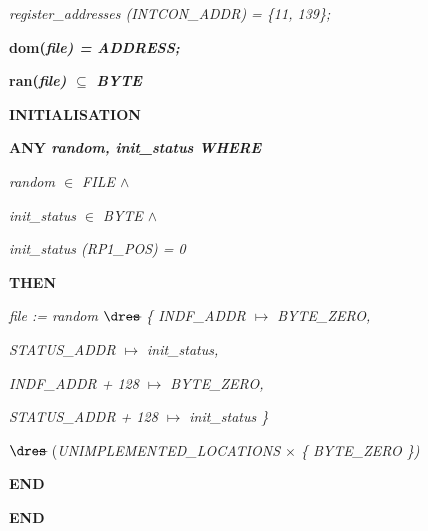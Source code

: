 \begin{sloppypar}
\hspace*{0.20in}\it register\_addresses \rm (\it INTCON\_ADDR\rm ) \rm = \rm \{\rm 1\rm 1\rm , \rm 1\rm 3\rm 9\rm \}\rm ;

\vspace*{4mm}
\hspace*{0.20in}\bf dom\rm (\it file\rm ) \rm = \it ADDRESS\rm ;

\hspace*{0.20in}\bf ran\rm (\it file\rm )  $\subseteq$  \it BYTE

\vspace*{4mm}
\bf INITIALISATION

\hspace*{0.20in}\bf ANY \it random\rm , \it init\_status \bf WHERE

\hspace*{0.40in}\it random  $\in$  \it FILE  $\land$ 

\hspace*{0.40in}\it init\_status  $\in$  \it BYTE  $\land$ 

\hspace*{0.40in}\it init\_status \rm (\it RP1\_POS\rm ) \rm = \rm 0

\hspace*{0.20in}\bf THEN

\hspace*{0.40in}\it file \rm := \it random  $\lover$  \rm \{ \it INDF\_ADDR  $\mapsto$  \it BYTE\_ZERO\rm ,

\hspace*{1.00in}\it STATUS\_ADDR  $\mapsto$  \it init\_status\rm ,

\hspace*{1.00in}\it INDF\_ADDR \rm + \rm 1\rm 2\rm 8  $\mapsto$  \it BYTE\_ZERO\rm ,

\hspace*{1.00in}\it STATUS\_ADDR \rm + \rm 1\rm 2\rm 8  $\mapsto$  \it init\_status \rm \}

\hspace*{0.80in} $\lover$  \rm (\it UNIMPLEMENTED\_LOCATIONS  $\times$  \rm \{ \it BYTE\_ZERO \rm \}\rm )

\hspace*{0.20in}\bf END

\bf END

\newpage
\end{sloppypar}
